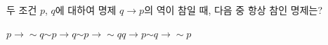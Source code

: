 두 조건 $p$, $q$에 대하여 명제 $q\longrightarrow p$의 역이 참일 때, 다음 중 항상 참인 명제는?
\begin{choices32}{$p\longrightarrow {\sim} q$}{${\sim} p\longrightarrow q$}{${\sim} p\longrightarrow {\sim} q$}{$q\longrightarrow p$}{${\sim} q\longrightarrow {\sim} p$}\end{choices32}
